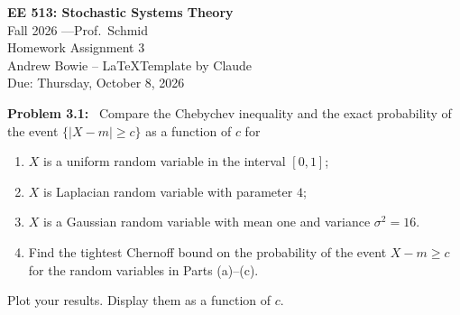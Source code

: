 \documentclass[11pt]{article}
\newenvironment{problem}[1]
{\par\bigskip\noindent\textbf{Problem #1:}\ }
{\par}
\begin{document}
    \begin{center}
        {\Large\textbf{EE 513: Stochastic Systems Theory}}\\[2pt]
        {\large Fall 2026 \quad---\quad Prof.\ Schmid}\\[6pt]
    {\large Homework Assignment 3}\\[4pt]
        Andrew Bowie -- \LaTeX  Template by Claude\\
        Due: Thursday, October 8, 2026
    \end{center}

    \begin{problem}{3.1}
Compare the Chebychev inequality and the exact probability of the event
$\{|X - m| \ge c\}$ as a function of $c$ for
\begin{enumerate}[label=(\alph*)]
  \item $X$ is a uniform random variable in the interval $[0,1]$;
  \item $X$ is Laplacian random variable with parameter $4$;
  \item $X$ is a Gaussian random variable with mean one and variance $\sigma^2 = 16$.
  \item Find the tightest Chernoff bound on the probability of the event
  $X - m \ge c$ for the random variables in Parts (a)--(c).
\end{enumerate}
Plot your results. Display them as a function of $c$.
    \end{problem}
\end{document}
